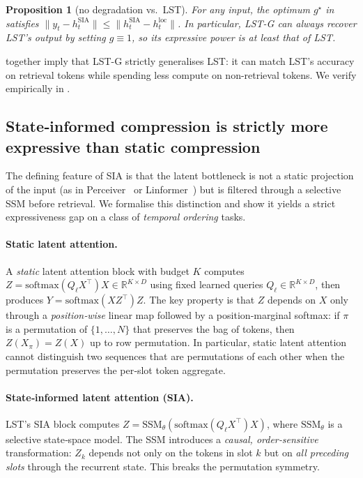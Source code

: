 \documentclass[10pt,twocolumn,letterpaper]{article}
\newcommand{\LST}{\textsc{LST}}
\newcommand{\SIA}{\textsc{SIA}}
\newtheorem{proposition}[theorem]{Proposition}
\begin{document}
\begin{proposition}[no degradation vs.\ \LST{}]
\label{prop:nodegrade}
For any input, the optimum $g^\star$ in  satisfies
$\|y_t - h^{\text{SIA}}_t\| \leq \|h^{\text{SIA}}_t - h^{\text{loc}}_t\|$.
In particular, \LST-G{} can always recover \LST{}'s output by setting
$g\!\equiv\!1$, so its expressive power is at least that of \LST{}.
\end{proposition}

 together imply that \LST-G{} strictly
generalises \LST{}: it can match \LST{}'s accuracy on retrieval tokens
while spending less compute on non-retrieval tokens.  We verify
 empirically in .

\subsection{State‑informed compression is strictly more expressive than static compression}
\label{sec:siac}

The defining feature of \SIA{} is that the latent bottleneck is not a
static projection of the input (as in Perceiver~\cite{jaegle2021perceiver}
or Linformer~\cite{wang2020linformer}) but is filtered through a selective
SSM before retrieval.  We formalise this distinction and show it yields a
strict expressiveness gap on a class of \emph{temporal ordering} tasks.

\paragraph{Static latent attention.}
A \emph{static} latent attention block with budget $K$ computes
$Z = \mathrm{softmax}(Q_\ell X^\top) X \in \mathbb{R}^{K\times D}$ using
fixed learned queries $Q_\ell\!\in\!\mathbb{R}^{K\times D}$, then produces
$Y = \mathrm{softmax}(X Z^\top) Z$.  The key property is that $Z$ depends
on $X$ only through a \emph{position‑wise} linear map followed by a
position‑marginal softmax: if $\pi$ is a permutation of $\{1,\dots,N\}$
that preserves the bag of tokens, then $Z(X_\pi)\!=\!Z(X)$ up to row
permutation.  In particular, static latent attention cannot distinguish
two sequences that are permutations of each other when the permutation
preserves the per‑slot token aggregate.

\paragraph{State‑informed latent attention (\SIA{}).}
\LST{}'s \SIA{} block computes $Z = \mathrm{SSM}_\theta(\mathrm{softmax}(Q_\ell X^\top) X)$,
where $\mathrm{SSM}_\theta$ is a selective state‑space model.  The SSM
introduces a \emph{causal, order‑sensitive} transformation: $Z_k$ depends
not only on the tokens in slot $k$ but on \emph{all preceding slots}
through the recurrent state.  This breaks the permutation symmetry.
\end{document}
